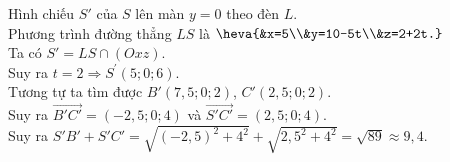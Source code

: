 \begin{bt}
{		Hình chiếu $S'$  của $S$ lên màn $y=0$ theo đèn $L$.\\
		Phương trình đường thẳng $LS$ là $\heva{&x=5\\&y=10-5t\\&z=2+2t.}$\\ 
		Ta có $S'=LS\cap  (Oxz)$.\\
		Suy ra $t=2 \Rightarrow  S^{\prime}(5; 0; 6)$.\\
		 Tương tự ta tìm được $B'(7{,}5;0;2)$, $C'(2,5; 0; 2)$.\\
		Suy ra  $\overrightarrow{B'C'}=(-2{,}5;0;4)$ và $\overrightarrow{S'C'}=(2{,}5;0;4)$.\\
		Suy ra $S'B'+S'C'=\sqrt{(-2{,}5)^2+4^2}+\sqrt{2{,}5^2+4^2}=\sqrt{89}\approx  9{,}4$.
	} 
\end{bt}

